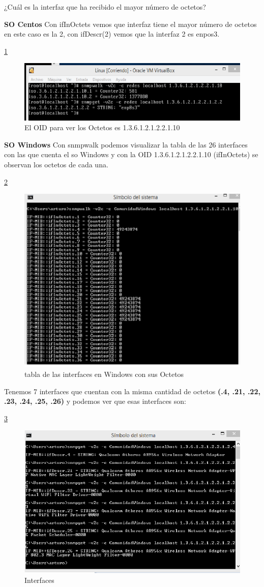 \item ¿Cuál es la interfaz que ha recibido el mayor número de octetos?

\textbf{SO Centos}
Con ifInOctets vemos que interfaz tiene el mayor número de octetos en este caso es la 2, con ifDescr(2) vemos que la interfaz  2 es enpos3.
 
\ref{image:Pregunta4O}
\FloatBarrier
\begin{figure}[htbp!]
		\centering
		    \includegraphics[width=.5 \textwidth]{../images/Pregunta4O.png} 
		\caption{El OID para ver los Octetos es 1.3.6.1.2.1.2.2.1.10}
		\label{image:Pregunta4O}
\end{figure}
\FloatBarrier

\textbf{SO Windows}
Con snmpwalk  podemos visualizar la tabla de las 26 interfaces con las que cuenta el so Windows y con la OID 1.3.6.1.2.1.2.2.1.10 (ifInOctets) se observan los octetos de cada una.

\ref{image:Pregunta4W}
\FloatBarrier
\begin{figure}[htbp!]
		\centering
		    \includegraphics[width=.5 \textwidth]{../images/Pregunta4W.png} 
		\caption{tabla de las interfaces en Windows con sus Octetos}
		\label{image:Pregunta4W}
\end{figure}
\FloatBarrier

 Tenemos 7 interfaces que cuentan con la misma cantidad de octetos \textbf{(.4, .21, .22, .23, .24, .25, .26)} y podemos ver que esas interfaces son:
 
\ref{image:Pregunta4W2}
\FloatBarrier
\begin{figure}[htbp!]
		\centering
		    \includegraphics[width=.5 \textwidth]{../images/Pregunta4W2.png} 
		\caption{Interfaces}
		\label{image:Pregunta4W2}
\end{figure}
\FloatBarrier


